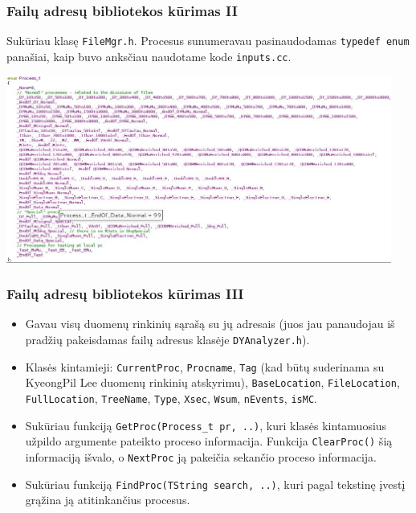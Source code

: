 \documentclass{beamer}
\begin{document}
\begin{frame}
\frametitle{Failų adresų bibliotekos kūrimas II}

Sukūriau klasę \texttt{FileMgr.h}. Procesus sunumeravau pasinaudodamas \texttt{typedef enum} panašiai, kaip buvo anksčiau naudotame kode \texttt{inputs.cc}.

\begin{center}
	\includegraphics[width=0.95\textwidth]{enum.JPG}
\end{center}

\end{frame}


\begin{frame}
\frametitle{Failų adresų bibliotekos kūrimas III}

\begin{itemize}
	\item Gavau visų duomenų rinkinių sąrašą su jų adresais (juos jau panaudojau iš pradžių pakeisdamas failų adresus klasėje \texttt{DYAnalyzer.h}).
	\item Klasės kintamieji: \texttt{CurrentProc}, \texttt{Procname}, \texttt{Tag} (kad būtų suderinama su KyeongPil Lee duomenų rinkinių atskyrimu), \texttt{BaseLocation}, \texttt{FileLocation}, \texttt{FullLocation}, \texttt{TreeName}, \texttt{Type}, \texttt{Xsec}, \texttt{Wsum}, \texttt{nEvents}, \texttt{isMC}. 
	\item Sukūriau funkciją \texttt{GetProc(Process\_t pr, ..)}, kuri klasės kintamuosius užpildo argumente pateikto proceso informacija. Funkcija \texttt{ClearProc()} šią informaciją išvalo, o \texttt{NextProc} ją pakeičia sekančio proceso informacija.  
	\item Sukūriau funkciją \texttt{FindProc(TString search, ..)}, kuri pagal tekstinę įvestį grąžina ją atitinkančius procesus.
\end{itemize}

\end{frame}
\end{document}
